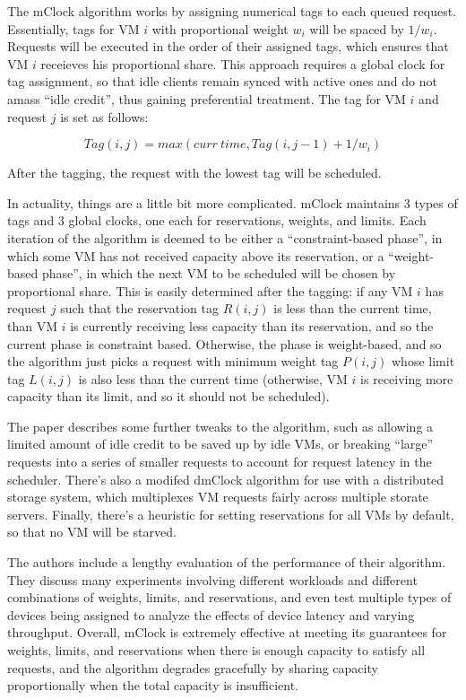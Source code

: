\documentclass[10pt]{article}
\begin{document}
\begin{multicols*}{2}
The mClock algorithm works by assigning numerical tags to each queued request.
Essentially, tags for VM $i$ with proportional weight $w_i$ will be spaced by $1/w_i$.
Requests will be executed in the order of their assigned tags, which ensures that
VM $i$ receieves his proportional share.  This approach requires a global clock
for tag assignment, so that idle clients remain synced with active ones and do not
amass ``idle credit'', thus gaining preferential treatment.  The tag for VM $i$ and
request $j$ is set as follows:

\[
	Tag(i, j) = max(curr~time, Tag(i, j-1) + 1/w_i)
\]

After the tagging, the request with the lowest tag will be scheduled.

In actuality, things are a little bit more complicated.  mClock maintains
3 types of tags and 3 global clocks, one each for reservations, weights,
and limits.  Each iteration of the algorithm is deemed to be
either a ``constraint-based phase'', in which some VM has not received
capacity above its reservation, or a ``weight-based phase'', in which the
next VM to be scheduled will be chosen by proportional share.  This is easily
determined after the tagging:  if any VM $i$ has request $j$ such that the
reservation tag $R(i, j)$ is less than the current time, than VM $i$ is currently
receiving less capacity than its reservation, and so the current phase is
constraint based.  Otherwise, the phase is weight-based, and so the algorithm
just picks a request with minimum weight tag $P(i, j)$ whose limit tag
$L(i, j)$ is also less than the current time (otherwise, VM $i$ is receiving
more capacity than its limit, and so it should not be scheduled).

The paper describes some further tweaks to the algorithm, such as allowing
a limited amount of idle credit to be saved up by idle VMs, or breaking ``large''
requests into a series of smaller requests to account for request latency
in the scheduler.  There's also a modifed dmClock algorithm for use with
a distributed storage system, which multiplexes VM requests fairly across multiple
storate servers.  Finally, there's a heuristic for setting reservations for
all VMs by default, so that no VM will be starved.

The authors include a lengthy evaluation of the performance of their algorithm.
They discuss many experiments involving different workloads and different combinations
of weights, limits, and reservations, and even test multiple types of devices
being assigned to analyze the effects of device latency and varying throughput.
Overall, mClock is extremely effective at meeting its guarantees for weights, limits,
and reservations when there is enough capacity to satisfy all requests, and
the algorithm degrades gracefully by sharing capacity proportionally when
the total capacity is insufficient.


\end{multicols*}
\end{document}
